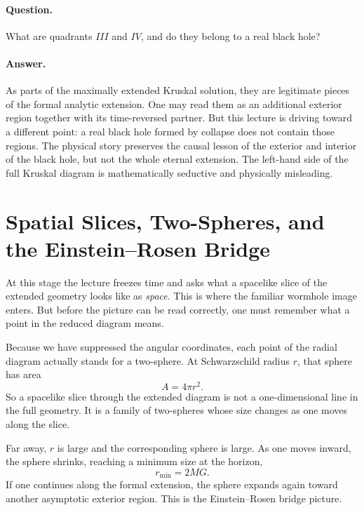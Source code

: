 \paragraph{Question.} What are quadrants \(III\) and \(IV\), and do they belong to a real black hole?

\paragraph{Answer.} As parts of the maximally extended Kruskal solution, they are legitimate pieces of the formal analytic extension. One may read them as an additional exterior region together with its time-reversed partner. But this lecture is driving toward a different point: a real black hole formed by collapse does not contain those regions. The physical story preserves the causal lesson of the exterior and interior of the black hole, but not the whole eternal extension. The left-hand side of the full Kruskal diagram is mathematically seductive and physically misleading.

\section{Spatial Slices, Two-Spheres, and the Einstein--Rosen Bridge}

At this stage the lecture freezes time and asks what a spacelike slice of the extended geometry looks like as \emph{space}. This is where the familiar wormhole image enters. But before the picture can be read correctly, one must remember what a point in the reduced diagram means.

Because we have suppressed the angular coordinates, each point of the radial diagram actually stands for a two-sphere. At Schwarzschild radius \(r\), that sphere has area
\begin{equation}
A = 4\pi r^2.
\end{equation}
So a spacelike slice through the extended diagram is not a one-dimensional line in the full geometry. It is a family of two-spheres whose size changes as one moves along the slice.

Far away, \(r\) is large and the corresponding sphere is large. As one moves inward, the sphere shrinks, reaching a minimum size at the horizon,
\begin{equation}
r_{\min}=2MG.
\end{equation}
If one continues along the formal extension, the sphere expands again toward another asymptotic exterior region. This is the Einstein--Rosen bridge picture.

